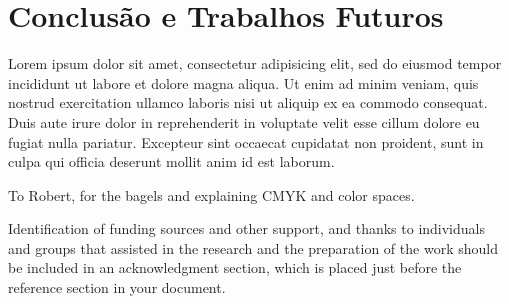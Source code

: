 \documentclass[sigconf]{acmart}
\begin{document}
\section{Conclusão e Trabalhos Futuros} \label{sec-conclusion}


Lorem ipsum dolor sit amet, consectetur adipisicing elit, sed do eiusmod
tempor incididunt ut labore et dolore magna aliqua. Ut enim ad minim veniam,
quis nostrud exercitation ullamco laboris nisi ut aliquip ex ea commodo
consequat. Duis aute irure dolor in reprehenderit in voluptate velit esse
cillum dolore eu fugiat nulla pariatur. Excepteur sint occaecat cupidatat non
proident, sunt in culpa qui officia deserunt mollit anim id est laborum.

\begin{acks}
To Robert, for the bagels and explaining CMYK and color spaces.

Identification of funding sources and other support, and thanks to
individuals and groups that assisted in the research and the
preparation of the work should be included in an acknowledgment
section, which is placed just before the reference section in your
document.
\end{acks}




\end{document}
